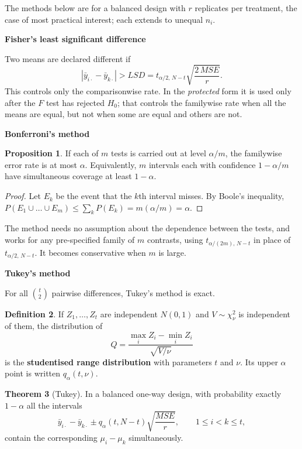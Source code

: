 \documentclass[11pt,a4paper]{article}
\numberwithin{equation}{section}
\theoremstyle{definition}
\newtheorem{thm}{Theorem}[subsection]
\newtheorem{defn}[thm]{Definition}
\newtheorem{prop}[thm]{Proposition}
\newcommand{\subhead}[1]{%
  \par\medskip\noindent\textbf{#1}\par\nobreak\smallskip}
\begin{document}
The methods below are for a balanced design with $r$ replicates per treatment, the case of most practical interest; each extends to unequal
$n_i$.

\subhead{Fisher's least significant difference}
Two means are declared different if
\[
|\bar y_{i\cdot} - \bar y_{k\cdot}| > LSD = t_{\alpha/2,\,N-t}\sqrt{\frac{2\,MSE}{r}} .
\]
This controls only the comparisonwise rate. In the \emph{protected} form it is used only after the $F$ test has rejected $H_0$; that controls the familywise
rate when all the means are equal, but not when some are equal and others are not.

\subhead{Bonferroni's method}
\begin{prop}\label{prop:bonferroni}
If each of $m$ tests is carried out at level $\alpha/m$, the familywise error rate is at most $\alpha$. Equivalently, $m$ intervals each with confidence
$1 - \alpha/m$ have simultaneous coverage at least $1 - \alpha$.
\end{prop}

\begin{proof}
Let $E_k$ be the event that the $k$th interval misses. By Boole's inequality, $P(E_1 \cup \dots \cup E_m) \le \sum_kP(E_k) = m(\alpha/m) = \alpha$.
\end{proof}

The method needs no assumption about the dependence between the tests, and works for any pre-specified family of $m$ contrasts, using
$t_{\alpha/(2m),\,N-t}$ in place of $t_{\alpha/2,\,N-t}$. It becomes conservative when $m$ is large.

\subhead{Tukey's method}
For all $\binom t2$ pairwise differences, Tukey's method is exact.

\begin{defn}
If $Z_1, \dots, Z_t$ are independent $N(0, 1)$ and $V \sim \chi^2_\nu$ is independent of them, the distribution of
\[
Q = \frac{\max_iZ_i - \min_iZ_i}{\sqrt{V/\nu}}
\]
is the \textbf{studentised range distribution} with parameters $t$ and $\nu$. Its upper $\alpha$ point is written $q_\alpha(t, \nu)$.
\end{defn}

\begin{thm}[Tukey]\label{thm:tukey}
In a balanced one-way design, with probability exactly $1 - \alpha$ all the intervals
\[
\bar y_{i\cdot} - \bar y_{k\cdot} \pm q_\alpha(t, N - t)\sqrt{\frac{MSE}{r}} , \qquad 1 \le i < k \le t ,
\]
contain the corresponding $\mu_i - \mu_k$ simultaneously.
\end{thm}
\end{document}
